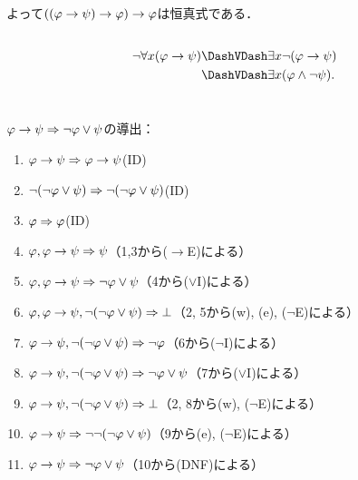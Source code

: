 よって\(\paren{\paren{\varphi \to \psi} \to \varphi} \to \varphi\)は恒真式である．

\subsection*{}

\begin{align*}
	\lnot \forall x \paren{\varphi \to \psi} & \logicallyequivalent \exists x \lnot \paren{\varphi \to \psi}    \\
	                                         & \logicallyequivalent \exists x \paren{\varphi \land \lnot \psi}.
\end{align*}

\section*{}

\subsection*{}

\(\varphi \to \psi \Rightarrow \lnot \varphi \lor \psi\)の導出：
\begin{enumerate}
	\item \(\varphi \to \psi \Rightarrow \varphi \to \psi\)\quad (ID)
	\item \(\lnot \paren{\lnot \varphi \lor \psi} \sequent \lnot \paren{\lnot \varphi \lor \psi}\)\quad (ID)
	\item \(\varphi \Rightarrow \varphi\)\quad (ID)
	\item \(\varphi, {\varphi \to \psi} \Rightarrow \psi\)\quad （1,3から(\(\to\)E)による）
	\item \(\varphi, {\varphi \to \psi} \Rightarrow \lnot \varphi \lor \psi\)\quad （4から(\(\lor\)I)による）
	\item \(\varphi, {\varphi \to \psi}, \lnot \paren{\lnot \varphi \lor \psi} \sequent \bot\)\quad （2, 5から(w), (e), (\(\lnot\)E)による）
	\item \(\varphi \to \psi, \lnot \paren{\lnot \varphi \lor \psi} \sequent \lnot \varphi\)\quad （6から(\(\lnot\)I)による）
	\item \(\varphi \to \psi, \lnot \paren{\lnot \varphi \lor \psi} \sequent \lnot \varphi \lor \psi\)\quad （7から(\(\lor\)I)による）
	\item \(\varphi \to \psi, \lnot \paren{\lnot \varphi \lor \psi} \sequent \bot\)\quad （2, 8から(w), (\(\lnot\)E)による）
	\item \(\varphi \to \psi \sequent \lnot \lnot \paren{\lnot \varphi \lor \psi}\)\quad （9から(e), (\(\lnot\)E)による）
	\item \(\varphi \to \psi \Rightarrow \lnot \varphi \lor \psi\)\quad （10から(DNF)による）
\end{enumerate}

